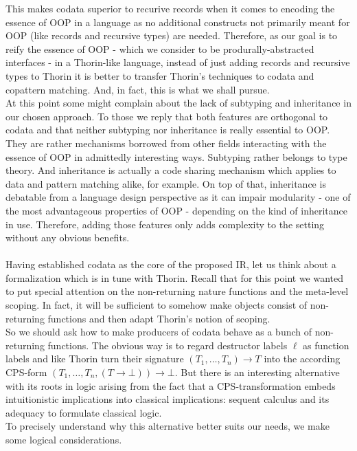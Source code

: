 This makes codata superior to recurive records when it comes to encoding the essence of OOP in a language as no additional constructs not primarily meant for OOP (like records and recursive types) are needed.
Therefore, as our goal is to reify the essence of OOP - which we consider to be produrally-abstracted interfaces - in a Thorin-like language, instead of just adding records and recursive types to Thorin it is better to transfer Thorin's techniques to codata and copattern matching.
And, in fact, this is what we shall pursue.
\\
At this point some might complain about the lack of subtyping and inheritance in our chosen approach.
To those we reply that both features are orthogonal to codata and that neither subtyping nor inheritance is really essential to OOP.
They are rather mechanisms borrowed from other fields interacting with the essence of OOP in admittedly interesting ways.
Subtyping rather belongs to type theory.
And inheritance is actually a code sharing mechanism which applies to data and pattern matching alike, for example.
On top of that, inheritance is debatable from a language design perspective as it can impair modularity - one of the most advantageous properties of OOP - depending on the kind of inheritance in use.
Therefore, adding those features only adds complexity to the setting without any obvious benefits.
\\\\
Having established codata as the core of the proposed IR, let us think about a formalization which is in tune with Thorin.
Recall that for this point we wanted to put special attention on the non-returning nature functions and the meta-level scoping.
In fact, it will be sufficient to somehow make objects consist of non-returning functions and then adapt Thorin's notion of scoping.
\\
So we should ask how to make producers of codata behave as a bunch of non-returning functions.
The obvious way is to regard destructor labels $\ell$ as function labels and like Thorin turn their signature $(T_{1}, \ldots, T_{n}) \to T$ into the according CPS-form $(T_{1}, \ldots, T_{n}, (T \to \bot)) \to \bot$.
But there is an interesting alternative with its roots in logic arising from the fact that a CPS-transformation embeds intuitionistic implications into classical implications: sequent calculus and its adequacy to formulate classical logic.
\\
To precisely understand why this alternative better suits our needs, we make some logical considerations.
